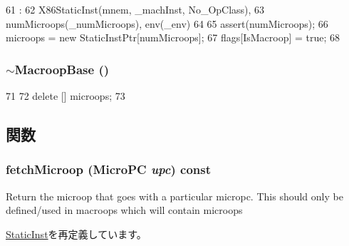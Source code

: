 \begin{DoxyCode}
61                                                        :
62                 X86StaticInst(mnem, _machInst, No_OpClass),
63                 numMicroops(_numMicroops), env(_env)
64     {
65         assert(numMicroops);
66         microops = new StaticInstPtr[numMicroops];
67         flags[IsMacroop] = true;
68     }

\end{DoxyCode}
\hypertarget{classX86ISA_1_1MacroopBase_a9647fe604d618e84ec3bdb7f1f3a887f}{
\subsubsection[{$\sim$MacroopBase}]{\setlength{\rightskip}{0pt plus 5cm}$\sim${\bf MacroopBase} ()}}
\label{classX86ISA_1_1MacroopBase_a9647fe604d618e84ec3bdb7f1f3a887f}



\begin{DoxyCode}
71     {
72         delete [] microops;
73     }
\end{DoxyCode}


\subsection{関数}
\hypertarget{classX86ISA_1_1MacroopBase_ae9e7acd6304ee397f1ab470e283ae76b}{
\subsubsection[{fetchMicroop}]{ fetchMicroop ({\bf MicroPC} {\em upc}) const}}
\label{classX86ISA_1_1MacroopBase_ae9e7acd6304ee397f1ab470e283ae76b}
Return the microop that goes with a particular micropc. This should only be defined/used in macroops which will contain microops 

\hyperlink{classStaticInst_aa5c7e6f7323850b84dbf5b8e47856173}{StaticInst}を再定義しています。



